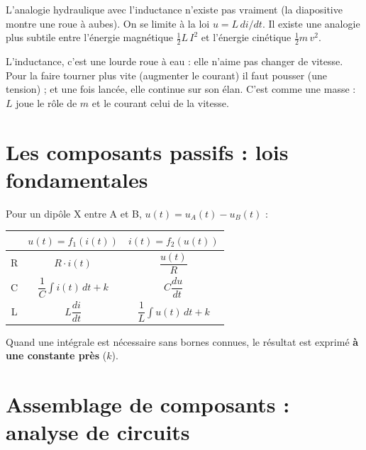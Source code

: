 \begin{rembox}[title=Analogie]
L'analogie hydraulique avec l'inductance n'existe pas vraiment (la diapositive montre une
roue à aubes). On se limite à la loi $u = L\,di/dt$. Il existe une analogie plus subtile entre
l'énergie magnétique $\frac12 L\,I^2$ et l'énergie cinétique $\frac12 m\,v^2$.
\end{rembox}

\begin{goatbox}
L'inductance, c'est une lourde roue à eau : elle n'aime pas changer de vitesse. Pour la
faire tourner plus vite (augmenter le courant) il faut pousser (une tension) ; et une fois
lancée, elle continue sur son élan. C'est comme une masse : $L$ joue le rôle de $m$ et le
courant celui de la vitesse.
\end{goatbox}

\section{Les composants passifs : lois fondamentales}


\begin{thmbox}[title={Tableau $u = f_1(i)$ et $i = f_2(u)$}]
Pour un dipôle X entre A et B, $u(t) = u_A(t) - u_B(t)$ :
\begin{center}
\renewcommand{\arraystretch}{1.6}
\begin{tabular}{c|c|c}
 & $u(t) = f_1(i(t))$ & $i(t) = f_2(u(t))$ \\ \hline
R & $R\cdot i(t)$ & $\dfrac{u(t)}{R}$ \\
C & $\dfrac1C\displaystyle\int i(t)\,dt + k$ & $C\dfrac{du}{dt}$ \\
L & $L\dfrac{di}{dt}$ & $\dfrac1L\displaystyle\int u(t)\,dt + k$ \\
\end{tabular}
\end{center}
Quand une intégrale est nécessaire sans bornes connues, le résultat est exprimé \textbf{à une
constante près} ($k$).
\end{thmbox}

\section{Assemblage de composants : analyse de circuits}


